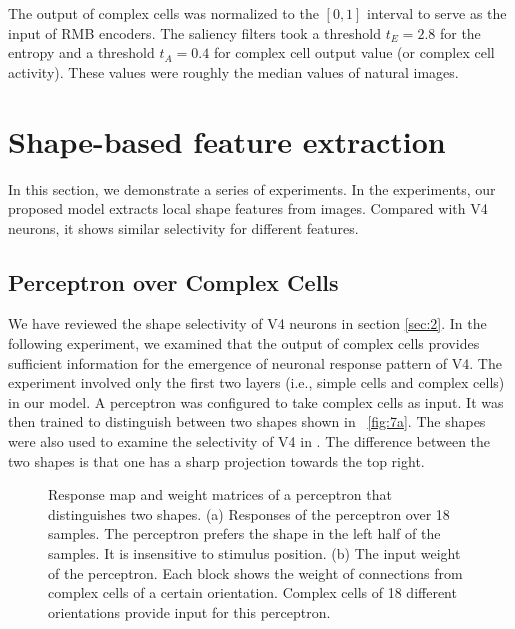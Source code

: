 \documentclass[5p]{elsarticle}
\begin{document}
The output of complex cells was normalized to the $[0,1]$ interval
to serve as the input of RMB encoders.
The saliency filters took a threshold $t_E=2.8$ for the entropy
and a threshold $t_A=0.4$ for complex cell output value (or complex cell activity).
These values were roughly the median values of natural images.

\section{Shape-based feature extraction}\label{sec:4}

In this section, we demonstrate a series of experiments.
In the experiments, our proposed model extracts local shape features from images.
Compared with V4 neurons, it shows similar selectivity for different features.

\subsection{Perceptron over Complex Cells}

We have reviewed the shape selectivity of V4 neurons in section \ref{sec:2}.
In the following experiment, we examined that the output of complex cells provides sufficient information
for the emergence of neuronal response pattern of V4.
The experiment involved only the first two layers (i.e., simple cells and complex cells) in our model.
A perceptron was configured to take complex cells as input.
It was then trained to distinguish between two shapes shown in \figurename~\ref{fig:7a}.
The shapes were also used to examine the selectivity of V4 in \cite{pasupathy2001}.
The difference between the two shapes is that one has a sharp projection towards the top right.

\begin{figure}
\centering
{}\hfil
{}
\caption{Response map and weight matrices of a perceptron that distinguishes two shapes.
(a) Responses of the perceptron over 18 samples.
The perceptron prefers the shape in the left half of the samples.
It is insensitive to stimulus position.
(b) The input weight of the perceptron. 
Each block shows the weight of connections from complex cells of a certain orientation.
Complex cells of 18 different orientations provide input for this perceptron.}
\label{fig:7}
\end{figure}
\end{document}
